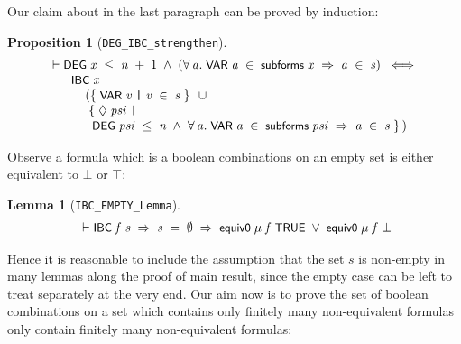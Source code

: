 \documentclass[letterpaper]{article}
\newtheorem{lm}{Lemma}
\newtheorem{prop}{Proposition}
\renewcommand{\HOLConst}[1]{{\textsf{\upshape\small #1}}}
\newenvironment{holmath}{\begin{displaymath}\begin{array}{l}}{\end{array}\end{displaymath}\ignorespacesafterend}
\begin{document}
Our claim about in the last paragraph can be proved by induction:
\begin{prop}[\texttt{DEG_IBC_strengthen}]
\begin{holmath}
  \ensuremath{\HOLTokenTurnstile}\HOLConst{DEG}\;\HOLFreeVar{x}\;\HOLSymConst{\HOLTokenLeq{}}\;\HOLFreeVar{n}\;\HOLSymConst{\ensuremath{+}}\;\HOLNumLit{1}\;\HOLSymConst{\HOLTokenConj{}}\;(\HOLSymConst{\HOLTokenForall{}}\HOLBoundVar{a}.\;\HOLConst{VAR}\;\HOLBoundVar{a}\;\HOLSymConst{\HOLTokenIn{}}\;\HOLConst{subforms}\;\HOLFreeVar{x}\;\HOLSymConst{\HOLTokenImp{}}\;\HOLBoundVar{a}\;\HOLSymConst{\HOLTokenIn{}}\;\HOLFreeVar{s})\;\HOLSymConst{\HOLTokenEquiv{}}\\
\;\;\;\;\;\;\;\HOLConst{IBC}\;\HOLFreeVar{x}\\
\;\;\;\;\;\;\;\;\;\;\;(\HOLTokenLeftbrace{}\HOLConst{VAR}\;\HOLBoundVar{v}\;\HOLTokenBar{}\;\HOLBoundVar{v}\;\HOLSymConst{\HOLTokenIn{}}\;\HOLFreeVar{s}\HOLTokenRightbrace{}\;\HOLSymConst{\HOLTokenUnion{}}\\
\;\;\;\;\;\;\;\;\;\;\;\;\HOLTokenLeftbrace{}\HOLSymConst{\ensuremath{\Diamond}}\;\HOLBoundVar{psi}\;\HOLTokenBar{}\\
\;\;\;\;\;\;\;\;\;\;\;\;\;\HOLConst{DEG}\;\HOLBoundVar{psi}\;\HOLSymConst{\HOLTokenLeq{}}\;\HOLFreeVar{n}\;\HOLSymConst{\HOLTokenConj{}}\;\HOLSymConst{\HOLTokenForall{}}\HOLBoundVar{a}.\;\HOLConst{VAR}\;\HOLBoundVar{a}\;\HOLSymConst{\HOLTokenIn{}}\;\HOLConst{subforms}\;\HOLBoundVar{psi}\;\HOLSymConst{\HOLTokenImp{}}\;\HOLBoundVar{a}\;\HOLSymConst{\HOLTokenIn{}}\;\HOLFreeVar{s}\HOLTokenRightbrace{})
\end{holmath}
\end{prop}

Observe a formula which is a boolean combinations on an empty set is either equivalent to $\bot$ or $\top$:
\begin{lm}[\texttt{IBC_EMPTY_Lemma}]
\begin{holmath}
  \ensuremath{\HOLTokenTurnstile}\HOLConst{IBC}\;\HOLFreeVar{f}\;\HOLFreeVar{s}\;\HOLSymConst{\HOLTokenImp{}}\;\HOLFreeVar{s}\;\HOLSymConst{=}\;\HOLSymConst{\HOLTokenEmpty{}}\;\HOLSymConst{\HOLTokenImp{}}\;\HOLConst{equiv0}\;\HOLFreeVar{\ensuremath{\mu}}\;\HOLFreeVar{f}\;\HOLConst{TRUE}\;\HOLSymConst{\HOLTokenDisj{}}\;\HOLConst{equiv0}\;\HOLFreeVar{\ensuremath{\mu}}\;\HOLFreeVar{f}\;\HOLSymConst{\ensuremath{\bot}}
\end{holmath}
\end{lm}

Hence it is reasonable to include the assumption that the set $s$ is non-empty in many lemmas along the proof of main result, since the empty case can be left to treat separately at the very end. Our aim now is to prove the set of boolean combinations on a set which contains only finitely many non-equivalent formulas only contain finitely many non-equivalent formulas:
\end{document}
